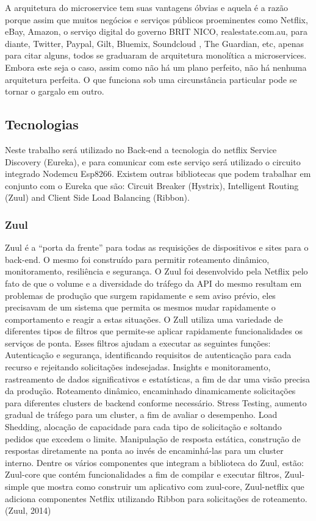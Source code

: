 A arquitetura do microservice tem suas vantagens óbvias e aquela é a razão porque assim que muitos negócios e serviços públicos proeminentes como Netflix, eBay, Amazon, o serviço digital do governo BRIT NICO, realestate.com.au, para diante, Twitter, Paypal, Gilt, Bluemix, Soundcloud , The Guardian, etc, apenas para citar alguns, todos se graduaram de arquitetura monolítica a microservices. Embora este seja o caso, assim como não há um plano perfeito, não há nenhuma arquitetura perfeita. O que funciona sob uma circunstância particular pode se tornar o gargalo em outro.

\subsection{Tecnologias}
Neste trabalho será utilizado no Back-end a tecnologia do netflix Service Discovery (Eureka), e para comunicar com este serviço será utilizado o circuito integrado Nodemcu Esp8266. Existem outras bibliotecas que podem trabalhar em conjunto com o Eureka que são: Circuit Breaker (Hystrix), Intelligent Routing (Zuul) and Client Side Load Balancing (Ribbon). 

\subsubsection{Zuul}
Zuul é a “porta da frente” para todas as requisições de dispositivos e sites para o back-end. O mesmo foi construído para permitir roteamento dinâmico, monitoramento, resiliência e segurança. O Zuul foi desenvolvido pela Netflix pelo fato de que o volume e a diversidade do tráfego da API do mesmo resultam em problemas de produção que surgem rapidamente e  sem aviso prévio, eles precisavam de um sistema que permita os mesmos mudar rapidamente o comportamento e reagir a estas situações.
O Zull utiliza uma variedade de diferentes tipos de filtros que permite-se aplicar rapidamente funcionalidades os serviços de ponta. Esses filtros ajudam a executar as seguintes funções: Autenticação e segurança, identificando requisitos de autenticação para cada recurso e rejeitando solicitações indesejadas. Insights e monitoramento, rastreamento de dados significativos e estatísticas, a fim de dar uma visão precisa da produção. Roteamento dinâmico, encaminhado dinamicamente solicitações para diferentes clusters de backend conforme necessário. Stress Testing, aumento gradual de tráfego para um cluster, a fim de avaliar o desempenho. Load Shedding, alocação de capacidade para cada tipo de solicitação e soltando pedidos que excedem o limite. Manipulação de resposta estática, construção de respostas diretamente na ponta ao invés de encaminhá-las para um cluster interno.
Dentre os vários componentes que integram a biblioteca do Zuul, estão: Zuul-core que contém funcionalidades a fim de compilar e executar filtros, Zuul-simple que mostra como construir um aplicativo com zuul-core, Zuul-netflix que adiciona componentes Netflix utilizando Ribbon para solicitações de roteamento. (Zuul, 2014)

